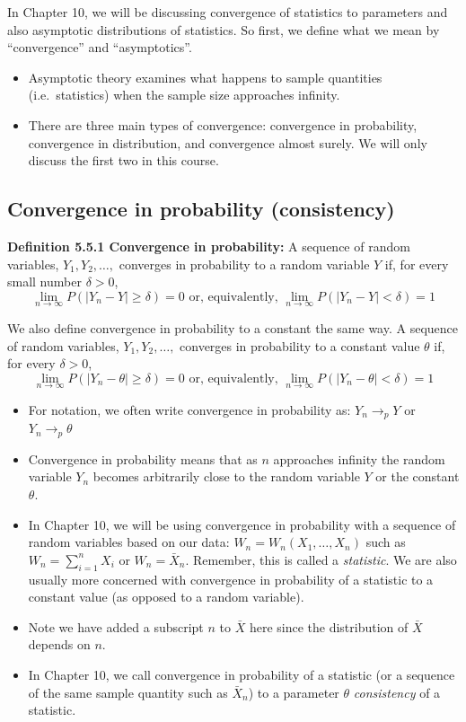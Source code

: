 \documentclass[11pt,]{article}
\providecommand{\tightlist}{%
  \setlength{\itemsep}{0pt}\setlength{\parskip}{0pt}}
\def\Xbar{\bar{ X}}
\begin{document}
In Chapter 10, we will be discussing convergence of statistics to
parameters and also asymptotic distributions of statistics. So first, we
define what we mean by ``convergence'' and ``asymptotics''.

\begin{itemize}
\tightlist
\item
  Asymptotic theory examines what happens to sample quantities
  (i.e.~statistics) when the sample size approaches infinity.
\item
  There are three main types of convergence: convergence in probability,
  convergence in distribution, and convergence almost surely. We will
  only discuss the first two in this course.
\end{itemize}

\hypertarget{convergence-in-probability-consistency}{%
\subsection{Convergence in probability
(consistency)}\label{convergence-in-probability-consistency}}

\noindent\textbf{Definition 5.5.1 Convergence in probability:} A
sequence of random variables, \(Y_1, Y_2, \ldots,\) converges in
probability to a random variable \(Y\) if, for every small number
\(\delta > 0\),
\[ \lim_{n\to \infty} P(|Y_n - Y| \geq \delta) = 0 \mbox{ or, equivalently, } \lim_{n\to\infty} P(|Y_n - Y|< \delta) = 1\]

We also define convergence in probability to a constant the same way. A
sequence of random variables, \(Y_1, Y_2, \ldots,\) converges in
probability to a constant value \(\theta\) if, for every \(\delta > 0\),
\[ \lim_{n\to \infty} P(|Y_n - \theta| \geq \delta) = 0 \mbox{ or, equivalently, } \lim_{n\to\infty} P(|Y_n - \theta|< \delta) = 1\]

\begin{itemize}
\tightlist
\item
  For notation, we often write convergence in probability as:
  \(Y_n \to_p Y\) or \(Y_n \to_p \theta\)
\item
  Convergence in probability means that as \(n\) approaches infinity the
  random variable \(Y_n\) becomes arbitrarily close to the random
  variable \(Y\) or the constant \(\theta\).
\item
  In Chapter 10, we will be using convergence in probability with a
  sequence of random variables based on our data:
  \(W_n = W_n(X_1, \ldots, X_n)\) such as \(W_n = \sum_{i=1}^n X_i\) or
  \(W_n = \Xbar_n\). Remember, this is called a \emph{statistic}. We are
  also usually more concerned with convergence in probability of a
  statistic to a constant value (as opposed to a random variable).
\item
  Note we have added a subscript \(n\) to \(\Xbar\) here since the
  distribution of \(\Xbar\) depends on \(n\).
\item
  In Chapter 10, we call convergence in probability of a statistic (or a
  sequence of the same sample quantity such as \(\Xbar_n\)) to a
  parameter \(\theta\) \emph{consistency} of a statistic.
\end{itemize}
\end{document}

